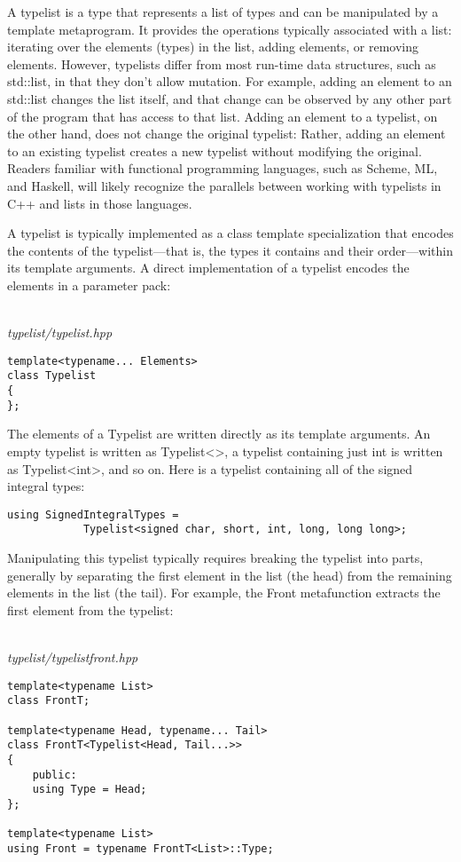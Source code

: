 A typelist is a type that represents a list of types and can be manipulated by a template metaprogram. It provides the operations typically associated with a list: iterating over the elements (types) in the list, adding elements, or removing elements. However, typelists differ from most run-time data structures, such as std::list, in that they don’t allow mutation. For example, adding an element to an std::list changes the list itself, and that change can be observed by any other part of the program that has access to that list. Adding an element to a typelist, on the other hand, does not change the original typelist: Rather, adding an element to an existing typelist creates a new typelist without modifying the original. Readers familiar with functional programming languages, such as Scheme, ML, and Haskell, will likely recognize the parallels between working with typelists in C++ and lists in those languages.

A typelist is typically implemented as a class template specialization that encodes the contents of the typelist—that is, the types it contains and their order—within its template arguments. A direct implementation of a typelist encodes the elements in a parameter pack:

\hspace*{\fill} \\ %
\noindent
\textit{typelist/typelist.hpp}
\begin{lstlisting}[style=styleCXX]
template<typename... Elements>
class Typelist
{
};
\end{lstlisting}

The elements of a Typelist are written directly as its template arguments. An empty typelist is written as Typelist<>, a typelist containing just int is written  as Typelist<int>, and so on. Here is a typelist containing all of the signed integral types:

\begin{lstlisting}[style=styleCXX]
using SignedIntegralTypes =
			Typelist<signed char, short, int, long, long long>;
\end{lstlisting}

Manipulating this typelist typically requires breaking the typelist into parts, generally by separating the first element in the list (the head) from the remaining elements in the list (the tail). For example, the Front metafunction extracts the first element from the typelist:

\hspace*{\fill} \\ %
\noindent
\textit{typelist/typelistfront.hpp}
\begin{lstlisting}[style=styleCXX]
template<typename List>
class FrontT;

template<typename Head, typename... Tail>
class FrontT<Typelist<Head, Tail...>>
{
	public:
	using Type = Head;
};

template<typename List>
using Front = typename FrontT<List>::Type;
\end{lstlisting}


